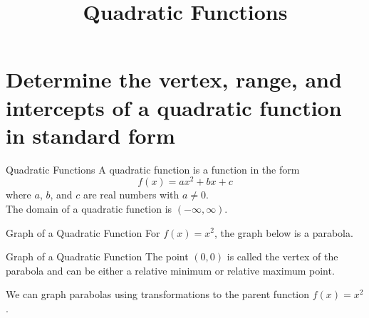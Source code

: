 \documentclass[t,usenames,dvipsnames]{beamer}
\title{Quadratic Functions}
\author{}
\date{}
\begin{document}
\begin{frame}
    \maketitle
\end{frame}

\section{Determine the vertex, range, and intercepts of a quadratic function in standard form}

\begin{frame}{Quadratic Functions}
A \alert{quadratic function} is a function in the form
\[ f(x) = ax^2 + bx + c \]
where $a$, $b$, and $c$ are real numbers with $a \neq 0$.   \newline\\

The domain of a quadratic function is $(-\infty, \infty)$.
\end{frame}

\begin{frame}{Graph of a Quadratic Function}
For $f(x) = x^2$, the graph below is a \alert{parabola}.
\begin{center}
\end{center}
\end{frame}

\begin{frame}{Graph of a Quadratic Function}
The point $(0,0)$ is called the \alert{vertex} of the parabola and can be either a relative minimum or relative maximum point. \newline\\  \pause

We can graph parabolas using transformations to the parent function $f(x) = x^2$.
\end{frame}
\end{document}
